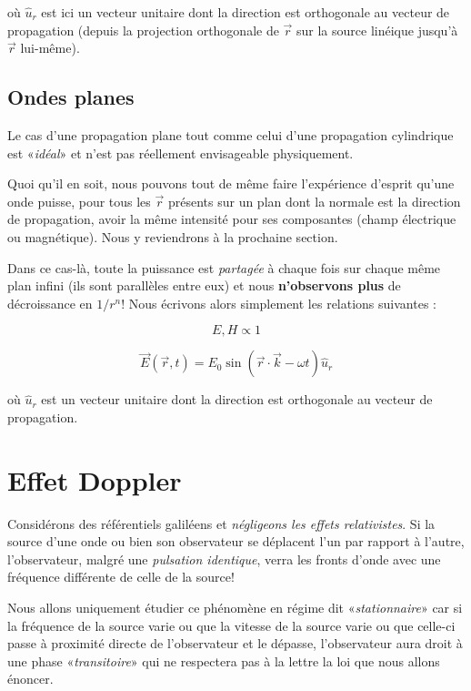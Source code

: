 où $\hat{u}_{r}$ est ici un vecteur unitaire dont la direction est orthogonale au vecteur de propagation (depuis la projection orthogonale de $\vec{r}$ sur la source linéique jusqu'à $\vec{r}$ lui-même).


\subsection{Ondes planes} 

Le cas d'une propagation plane tout comme celui d'une propagation cylindrique est «\textit{idéal}» et n'est pas réellement envisageable physiquement.

Quoi qu'il en soit, nous pouvons tout de même faire l'expérience d'esprit qu'une onde puisse, pour tous les $\vec{r}$ présents sur un plan dont la normale est la direction 
de propagation, avoir la même intensité pour ses composantes (champ électrique ou magnétique). Nous y reviendrons à la prochaine section.

Dans ce cas-là, toute la puissance est \textit{partagée} à chaque fois sur chaque même plan infini (ils sont parallèles entre eux) et nous \textbf{n'observons plus} de décroissance 
en $1/r^{n}$! Nous écrivons alors simplement les relations suivantes : 

\[E,H \propto 1\]

\[\vec{E}(\vec{r},t) = E_{0} \sin(\vec{r}\cdot \vec{k}-\omega t) \hat{u}_{r}\]

où $\hat{u}_{r}$ est un vecteur unitaire dont la direction est orthogonale au vecteur de propagation.

\section{Effet Doppler}

Considérons des référentiels galiléens et \textit{négligeons les effets relativistes}. 
Si la source d'une onde ou bien son observateur se déplacent l'un par rapport à l'autre, l'observateur, malgré une \textit{pulsation identique}, verra les fronts d'onde avec une fréquence différente de celle de la source!

Nous allons uniquement étudier ce phénomène en régime dit «\textit{stationnaire}» car si la fréquence de la source varie ou que la vitesse de la source varie ou que celle-ci 
passe à proximité directe de l'observateur et le dépasse, l'observateur aura droit à une phase «\textit{transitoire}» qui ne respectera pas à la lettre la loi que nous allons énoncer.

